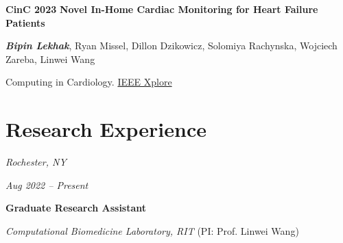 \documentclass[10pt, letterpaper]{article}
\begin{document}
    \vspace{0.3 cm}

    \begin{samepage}
        \begin{twocolentry}{
            \textbf{CinC 2023}
            }
            \textbf{Novel In-Home Cardiac Monitoring for Heart Failure Patients}

            \vspace{0.05 cm}

            \textbf{\textit{Bipin Lekhak}}, Ryan Missel, Dillon Dzikowicz, Solomiya Rachynska, Wojciech Zareba, Linwei Wang

            \vspace{0.05 cm}

            Computing in Cardiology.
            \href{https://ieeexplore.ieee.org/abstract/document/10363960}{IEEE Xplore}
        \end{twocolentry}
    \end{samepage}


    \section{Research Experience}

    \begin{twocolentry}{
        \textit{Rochester, NY}

        \textit{Aug 2022 – Present}}
        \textbf{Graduate Research Assistant}

        \textit{Computational Biomedicine Laboratory, RIT} (PI: Prof. Linwei Wang)
    \end{twocolentry}
\end{document}
